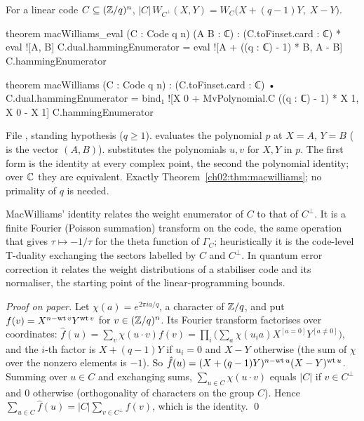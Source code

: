 \begin{theorem}\label{ch02:thm:macwilliams}
For a linear code $C\subseteq({\mathbb{Z}}/q)^n$,
$|C|\,W_{C^\perp}(X,Y)=W_C\bigl(X+(q-1)Y,\;X-Y\bigr)$.
\end{theorem}
\begin{leancode}
theorem macWilliams_eval (C : Code q n) (A B : ℂ) :
    (C.toFinset.card : ℂ) * eval ![A, B] C.dual.hammingEnumerator
      = eval ![A + ((q : ℂ) - 1) * B, A - B] C.hammingEnumerator

theorem macWilliams (C : Code q n) :
    (C.toFinset.card : ℂ) • C.dual.hammingEnumerator
      = bind₁ ![X 0 + MvPolynomial.C ((q : ℂ) - 1) * X 1, X 0 - X 1] C.hammingEnumerator
\end{leancode}
\begin{dictionary}
File , standing hypothesis \lean{[NeZero q]} ($q\ge1$).
 evaluates the polynomial $p$ at $X=A$, $Y=B$ (\lean{![A, B]} is the vector
$(A,B)$).   substitutes the polynomials $u,v$ for $X,Y$ in $p$.  The first
form is the identity at every complex point, the second the polynomial identity; over ${\mathbb{C}}$ they
are equivalent.  Exactly Theorem~\ref{ch02:thm:macwilliams}; no primality of $q$ is needed.
\end{dictionary}
\begin{physics}
MacWilliams' identity relates the weight enumerator of $C$ to that of $C^\perp$. It is a finite Fourier (Poisson summation) transform on the code, the same operation that gives $\tau\mapsto-1/\tau$ for the theta function of $\Gamma_C$; heuristically it is the code-level T-duality exchanging the sectors labelled by $C$ and $C^\perp$. In quantum error correction it relates the weight distributions of a stabiliser code and its normaliser, the starting point of the linear-programming bounds.
\end{physics}
\emph{Proof on paper.}  Let $\chi(a)=e^{2\pi ia/q}$, a character of ${\mathbb{Z}}/q$, and put
$f(v)=X^{n-\operatorname{wt} v}Y^{\operatorname{wt} v}$ for $v\in({\mathbb{Z}}/q)^n$.  Its Fourier transform factorises over
coordinates: $\hat f(u)=\sum_v\chi(u\cdot v)f(v)=\prod_i\bigl(\sum_{a}\chi(u_ia)X^{[a=0]}
Y^{[a\ne0]}\bigr)$, and the $i$-th factor is $X+(q-1)Y$ if $u_i=0$ and $X-Y$ otherwise (the sum of
$\chi$ over the nonzero elements is $-1$).  So $\hat f(u)=(X+(q-1)Y)^{n-\operatorname{wt} u}(X-Y)^{\operatorname{wt}
u}$.  Summing over $u\in C$ and exchanging sums, $\sum_{u\in C}\chi(u\cdot v)$ equals $|C|$ if
$v\in C^\perp$ and $0$ otherwise (orthogonality of characters on the group $C$).  Hence
$\sum_{u\in C}\hat f(u)=|C|\sum_{v\in C^\perp}f(v)$, which is the identity.  \qed

